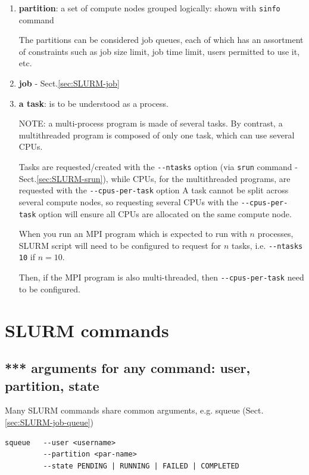 \begin{enumerate}
  \item {\bf partition}: a set of compute nodes grouped logically: shown with
  \verb!sinfo! command

The partitions can be considered job queues, each of which has an assortment of
constraints such as job size limit, job time limit, users permitted to use it, etc. 

  \item {\bf job} - Sect.\ref{sec:SLURM-job}
  
  \item {\bf a task}: is to be understood as a process.
  
NOTE: a multi-process program is made of several tasks. By contrast, a
multithreaded program is composed of only one task, which can use several CPUs. 

Tasks are requested/created with the \verb!--ntasks! option (via \verb!srun!
command - Sect.\ref{sec:SLURM-srun}), while CPUs, for the multithreaded
programs, are requested with the \verb!--cpus-per-task! option A task cannot be
split across several compute nodes, so requesting several CPUs  with the
\verb!--cpus-per-task! option will ensure all CPUs are allocated on the same
compute node.

When you run an MPI program which is expected to run with $n$ processes, SLURM
script will need to be configured to request for $n$ tasks, i.e.
\verb!--ntasks 10! if $n=10$.

Then, if the MPI program is also multi-threaded, then \verb!--cpus-per-task!
need to be configured. 

\end{enumerate}

\section{SLURM commands}

\subsection{*** arguments for any command: user, partition, state}

Many SLURM commands share common arguments, e.g. squeue
(Sect.\ref{sec:SLURM-job-queue})
\begin{verbatim}
squeue   --user <username> 
         --partition <par-name>
         --state PENDING | RUNNING | FAILED | COMPLETED
\end{verbatim}


